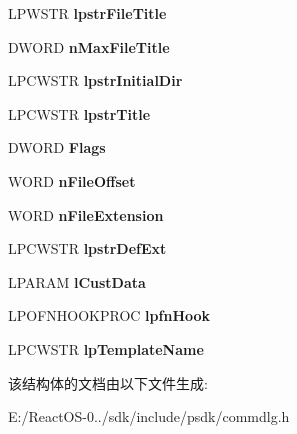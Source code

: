 \begin{DoxyCompactItemize}
\mbox{\label{structtag_o_f_n_w_a90b9be67a98873816dfbc3124937efb5}} 
L\+P\+W\+S\+TR {\bfseries lpstr\+File\+Title}
\item 
\mbox{\label{structtag_o_f_n_w_a25031bff044755799b7579b7eeb4995d}} 
D\+W\+O\+RD {\bfseries n\+Max\+File\+Title}
\item 
\mbox{\label{structtag_o_f_n_w_a5b428c578625f078af332693dcb3a259}} 
L\+P\+C\+W\+S\+TR {\bfseries lpstr\+Initial\+Dir}
\item 
\mbox{\label{structtag_o_f_n_w_a8d10213159cb2b0607e82f05a1b49422}} 
L\+P\+C\+W\+S\+TR {\bfseries lpstr\+Title}
\item 
\mbox{\label{structtag_o_f_n_w_a0fdc9c585828912a6de0c5bbe6c873bf}} 
D\+W\+O\+RD {\bfseries Flags}
\item 
\mbox{\label{structtag_o_f_n_w_a85b9466bddcb42f5ce2712b6521c9be2}} 
W\+O\+RD {\bfseries n\+File\+Offset}
\item 
\mbox{\label{structtag_o_f_n_w_a3ad7410c5181b4faa509500029d29837}} 
W\+O\+RD {\bfseries n\+File\+Extension}
\item 
\mbox{\label{structtag_o_f_n_w_aae71d0ca32e97b6d4a3ffc3748ed37ba}} 
L\+P\+C\+W\+S\+TR {\bfseries lpstr\+Def\+Ext}
\item 
\mbox{\label{structtag_o_f_n_w_abcfa340b3e0e31d41a281bbade70f9ec}} 
L\+P\+A\+R\+AM {\bfseries l\+Cust\+Data}
\item 
\mbox{\label{structtag_o_f_n_w_a73d3866400650516e12b7d4f620c479e}} 
L\+P\+O\+F\+N\+H\+O\+O\+K\+P\+R\+OC {\bfseries lpfn\+Hook}
\item 
\mbox{\label{structtag_o_f_n_w_a4a873a2b0113afca39f04d29d590f2bf}} 
L\+P\+C\+W\+S\+TR {\bfseries lp\+Template\+Name}
\end{DoxyCompactItemize}


该结构体的文档由以下文件生成\+:\begin{DoxyCompactItemize}
\item 
E\+:/\+React\+O\+S-\/0../sdk/include/psdk/commdlg.\+h\end{DoxyCompactItemize}
